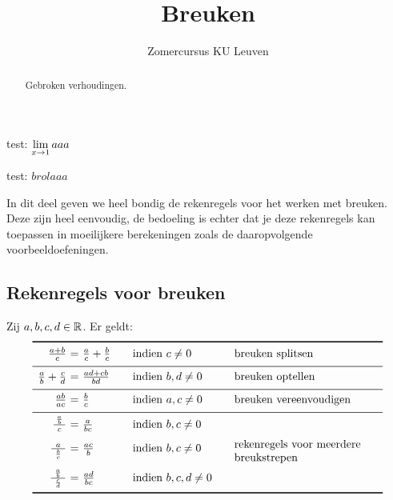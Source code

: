 \documentclass[numbers,wordchoicegiven]{ximera}
\author{Zomercursus KU Leuven}
\title[Rekenvaardigheden:]{Breuken}
\renewcommand\limxi{brol}
\renewcommand\ds{}
\begin{document}
\begin{abstract}
	Gebroken verhoudingen.
\end{abstract}
\maketitle

test: $\limxg{1} aaa$

test: $\limxi aaa$


In dit deel geven we heel bondig de rekenregels voor het werken
met breuken. Deze zijn heel eenvoudig, de bedoeling is echter dat
je deze rekenregels kan toepassen in moeilijkere berekeningen
zoals de daaropvolgende voorbeeldoefeningen.

\subsection{Rekenregels voor breuken}
\begin{proposition}
Zij $a,b,c,d\in \mathbb{R}$. Er geldt:
\[
\begin{array}{r@{\ }c@{\ }l@{\qquad}l@{\qquad}l}
\specialrule{.1em}{0ex}{1ex}
\ds{\frac{a+b}{c}}&=&\ds{\frac{a}{c}+\frac{b}{c}}&\textrm{indien }c \neq 0&\textrm{breuken splitsen}\\
\addlinespace[.7ex]
\midrule
\addlinespace[.7ex]
\ds{\frac{a}{b}+\frac{c}{d}}&=&\ds{\frac{ad+cb}{bd}}&\textrm{indien }b,d \neq 0&\textrm{breuken optellen}\\
\addlinespace[.7ex]
\midrule
\addlinespace[.7ex]
\ds{\frac{ab}{ac}}&=&\ds{\frac{b}{c}}&\textrm{indien }a,c \neq 0&\textrm{breuken vereenvoudigen}\\
\addlinespace[.7ex]
\midrule
\addlinespace[.7ex]
\ds{\frac{\frac{a}{b}}{\ c\ }}&=&\ds{\frac{a}{bc}}&\textrm{indien }b,c \neq 0&\multirow{5}{4.5cm}{\textrm{rekenregels voor meerdere breukstrepen}}\\\addlinespace[2.2ex]
\ds{\frac{a}{\ \frac{b}{c}\ }}&=&\ds{\frac{ac}{b}}&\textrm{indien }b,c \neq 0&\\\addlinespace[2.2ex]
\ds{\frac{\frac{a}{b}}{\ \frac{c}{d}\ }}&=&\ds{\frac{ad}{bc}}&\textrm{indien }b,c,d \neq 0&\\
\specialrule{.1em}{1ex}{0ex}
\end{array}
\]
\end{proposition}
\end{document}
